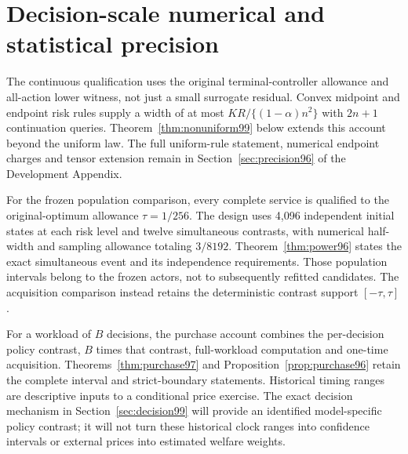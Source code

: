 \section{Decision-scale numerical and statistical precision}\label{sec:precision99}
The continuous qualification uses the original terminal-controller allowance and all-action lower witness, not just a small surrogate residual. Convex midpoint and endpoint risk rules supply a width of at most $KR/\{(1-\alpha)n^2\}$ with $2n+1$ continuation queries. Theorem~\ref{thm:nonuniform99} below extends this account beyond the uniform law. The full uniform-rule statement, numerical endpoint charges and tensor extension remain in Section~\ref{sec:precision96} of the Development Appendix.

For the frozen population comparison, every complete service is qualified to the original-optimum allowance $\tau=1/256$. The design uses 4,096 independent initial states at each risk level and twelve simultaneous contrasts, with numerical half-width and sampling allowance totaling $3/8192$. Theorem~\ref{thm:power96} states the exact simultaneous event and its independence requirements. Those population intervals belong to the frozen actors, not to subsequently refitted candidates. The acquisition comparison instead retains the deterministic contrast support $[-\tau,\tau]$.

For a workload of $B$ decisions, the purchase account combines the per-decision policy contrast, $B$ times that contrast, full-workload computation and one-time acquisition. Theorems~\ref{thm:purchase97} and Proposition~\ref{prop:purchase96} retain the complete interval and strict-boundary statements. Historical timing ranges are descriptive inputs to a conditional price exercise. The exact decision mechanism in Section~\ref{sec:decision99} will provide an identified model-specific policy contrast; it will not turn these historical clock ranges into confidence intervals or external prices into estimated welfare weights.
